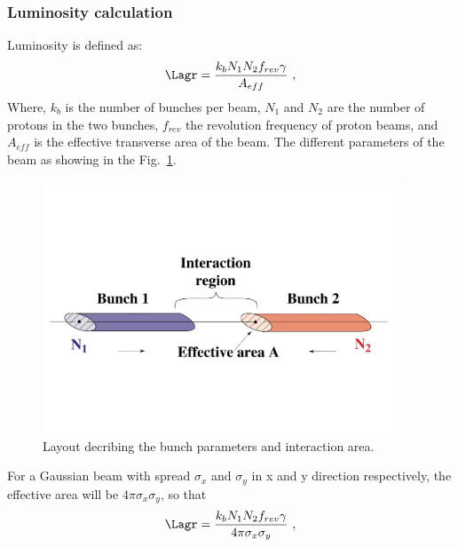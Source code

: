 \subsubsection{Luminosity calculation} %
\label{ssub:luminosity_calculation}
Luminosity is defined as:
\begin{equation}
    \Lagr = \frac{k_bN_1N_2f_{rev}\gamma}{A_{eff}}~,
\end{equation}
Where, $k_b$ is the number of bunches per beam, $N_1$ and $N_2$ are the number of protons in the two bunches, $f_{rev}$ the revolution frequency of proton beams, and $A_{eff}$ is the effective transverse area of the beam. The different parameters of the beam as showing in the Fig.~\ref{fig:lumi}.
\begin{figure}[!htbp]
	\centering
	\includegraphics[width=0.95\textwidth]{figures/LHC/Luminosity_calculation.pdf}
	\caption{Layout decribing the bunch parameters and interaction area.}
	\label{fig:lumi}
\end{figure}
For a Gaussian beam with spread $\sigma_x$ and $\sigma_y$ in x and y direction respectively, the effective area will be $4\pi \sigma_x \sigma_y$, so that
\begin{equation}\label{eq:luminosity}
    \Lagr = \frac{k_bN_1N_2f_{rev}\gamma}{4 \pi \sigma_x \sigma_y}~,
\end{equation}
